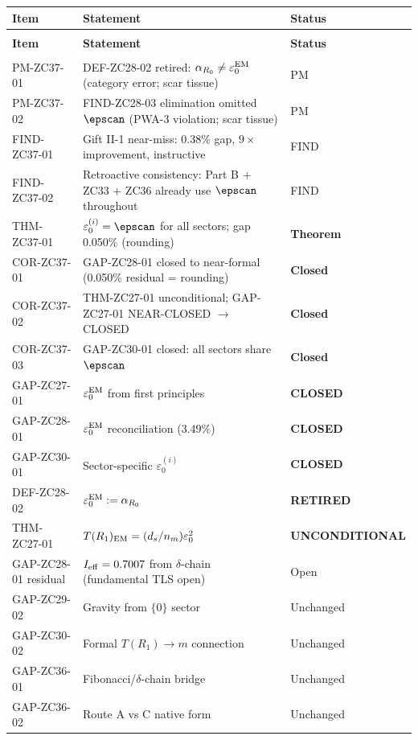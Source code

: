 \documentclass[12pt, a4paper]{article}
\begin{document}
{\small
\setlength{\LTpre}{4pt}
\setlength{\LTpost}{4pt}
\renewcommand{\arraystretch}{1.30}
\begin{longtable}{>{\raggedright\arraybackslash}p{2.8cm}
                  >{\raggedright\arraybackslash}p{7.2cm}
                  >{\centering\arraybackslash}p{2.2cm}}
\toprule
\textbf{Item} & \textbf{Statement} & \textbf{Status} \\
\midrule
\endfirsthead
\multicolumn{3}{l}{\small\textit{(continued)}}\\[4pt]
\toprule
\textbf{Item} & \textbf{Statement} & \textbf{Status} \\
\midrule
\endhead
\midrule
\multicolumn{3}{r}{\small\textit{(continues)}}\\
\endfoot
\bottomrule
\endlastfoot
PM-ZC37-01    & DEF-ZC28-02 retired: $\alpha_{R_0} \neq \varepsilon_0^{\rm EM}$
                (category error; scar tissue) & PM \\
PM-ZC37-02    & FIND-ZC28-03 elimination omitted $\epscan$
                (PWA-3 violation; scar tissue) & PM \\
FIND-ZC37-01  & Gift II-1 near-miss: 0.38\% gap,
                $9\times$ improvement, instructive & FIND \\
FIND-ZC37-02  & Retroactive consistency: Part B + ZC33 + ZC36
                already use $\epscan$ throughout & FIND \\
THM-ZC37-01   & $\varepsilon_0^{(i)} = \epscan$ for all sectors;
                gap 0.050\% (rounding) & \textbf{Theorem} \\
COR-ZC37-01   & GAP-ZC28-01 closed to near-formal
                (0.050\% residual = rounding) & \textbf{Closed} \\
COR-ZC37-02   & THM-ZC27-01 unconditional;
                GAP-ZC27-01 NEAR-CLOSED $\to$ CLOSED & \textbf{Closed} \\
COR-ZC37-03   & GAP-ZC30-01 closed:
                all sectors share $\epscan$ & \textbf{Closed} \\
\midrule
GAP-ZC27-01   & $\varepsilon_0^{\rm EM}$ from first principles &
                \textbf{CLOSED} \\
GAP-ZC28-01   & $\varepsilon_0^{\rm EM}$ reconciliation ($3.49\%$) &
                \textbf{CLOSED} \\
GAP-ZC30-01   & Sector-specific $\varepsilon_0^{(i)}$ &
                \textbf{CLOSED} \\
DEF-ZC28-02   & $\varepsilon_0^{\rm EM} := \alpha_{R_0}$ &
                \textbf{RETIRED} \\
THM-ZC27-01   & $T(R_1)_{\rm EM} = (d_s/n_m)\varepsilon_0^2$ &
                \textbf{UNCONDITIONAL} \\
\midrule
GAP-ZC28-01 residual & $I_{\rm eff} = 0.7007$ from
  $\delta$-chain (fundamental TLS open) & Open \\
GAP-ZC29-02   & Gravity from $\{0\}$ sector & Unchanged \\
GAP-ZC30-02   & Formal $T(R_1)\to m$ connection & Unchanged \\
GAP-ZC36-01   & Fibonacci/$\delta$-chain bridge & Unchanged \\
GAP-ZC36-02   & Route A vs C native form & Unchanged \\
\end{longtable}
}
\end{document}
